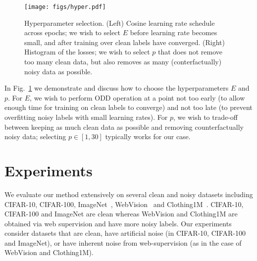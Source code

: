 \documentclass[a4paper,11pt]{article}
\begin{document}
\begin{figure}
    \centering
    \texttt{[image: figs/hyper.pdf]}
    \caption{Hyperparameter selection. (Left) Cosine learning rate schedule across epochs; we wish to select $E$ before learning rate becomes small, and after training over clean labels have converged. (Right) Histogram of the losses; we wish to select $p$ that does not remove too many clean data, but also removes as many (conterfactually) noisy data as possible.}
    \label{fig:hyper}
\end{figure}

In Fig.~\ref{fig:hyper} we demonstrate and discuss how to choose the hyperparameters $E$ and $p$. For $E$, we wish to perform ODD operation at a point not too early (to allow enough time for training on clean labels to converge) and not too late (to prevent overfitting noisy labels with small learning rates). For $p$, we wish to trade-off between keeping as much clean data as possible and removing counterfactually noisy data; selecting $p \in [1, 30]$ typically works for our case. \section{Experiments}
\label{sec:experiments}
We evaluate our method extensively on several clean and noisy datasets including CIFAR-10, CIFAR-100,  ImageNet~\cite{russakovsky2015imagenet}, WebVision~\cite{li2017webvision} and Clothing1M~\cite{xiao2015learning}. CIFAR-10, CIFAR-100 and ImageNet are clean whereas WebVision and Clothing1M are obtained via web supervision and have more noisy labels. Our experiments consider datasets that are clean, have artificial noise (in CIFAR-10, CIFAR-100 and ImageNet), or have inherent noise from web-supervision (as in the case of WebVision and Clothing1M). 
\end{document}
